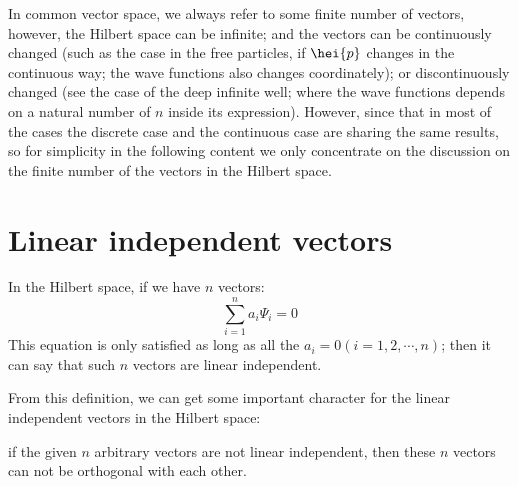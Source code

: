 In common vector space, we always refer to some finite number of
vectors, however, the Hilbert space can be infinite; and the vectors
can be continuously changed (such as the case in the free particles,
if $\hei{p}$ changes in the continuous way; the wave functions also
changes coordinately); or discontinuously changed (see the case of the
deep infinite well; where the wave functions depends on a natural
number of $n$ inside its expression). However, since that in most of
the cases the discrete case and the continuous case are sharing the
same results, so for simplicity in the following content we only
concentrate on the discussion on the finite number of the vectors in
the Hilbert space.

\section{Linear independent vectors}
\label{LIV_in_Hilbert}
%
%

In the Hilbert space, if we have $n$ vectors:
\begin{equation}\label{Hilberteq:1}
\sum^{n}_{i=1}a_{i}\Psi_{i} = 0
\end{equation}
This equation is only satisfied as long as all the $a_{i} = 0
(i=1,2,\cdots, n)$; then it can say that such $n$ vectors are linear
independent.

From this definition, we can get some important character for the
linear independent vectors in the Hilbert space:
\begin{theorem}
if the given $n$ arbitrary vectors are not linear independent, then
these $n$ vectors can not be orthogonal with each other.
\end{theorem}

